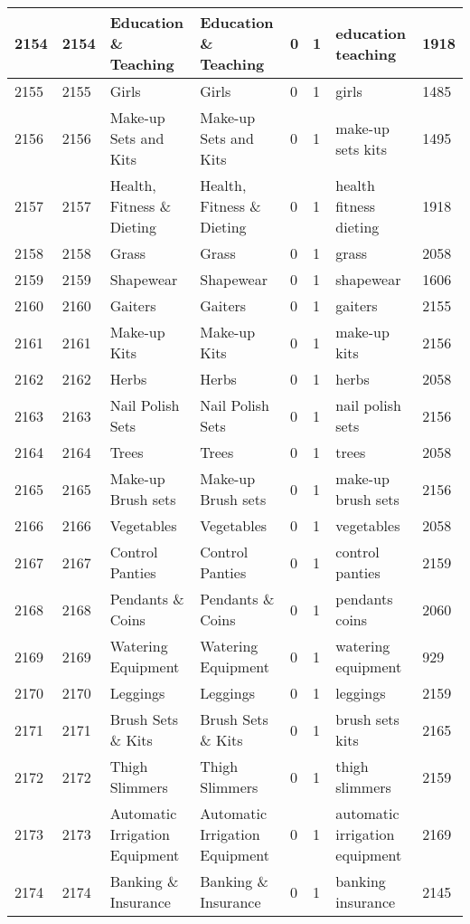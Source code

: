 \begin{longtable}{|l|l|l|l|l|l|l|l|}
2154 & 2154 & Education \& Teaching & Education \& Teaching & 0 & 1 & education teaching & 1918 \\ \hline 
2155 & 2155 & Girls & Girls & 0 & 1 & girls & 1485 \\ \hline 
2156 & 2156 & Make-up Sets and Kits & Make-up Sets and Kits & 0 & 1 & make-up sets kits & 1495 \\ \hline 
2157 & 2157 & Health, Fitness \& Dieting & Health, Fitness \& Dieting & 0 & 1 & health fitness dieting & 1918 \\ \hline 
2158 & 2158 & Grass & Grass & 0 & 1 & grass & 2058 \\ \hline 
2159 & 2159 & Shapewear & Shapewear & 0 & 1 & shapewear & 1606 \\ \hline 
2160 & 2160 & Gaiters & Gaiters & 0 & 1 & gaiters & 2155 \\ \hline 
2161 & 2161 & Make-up Kits & Make-up Kits & 0 & 1 & make-up kits & 2156 \\ \hline 
2162 & 2162 & Herbs & Herbs & 0 & 1 & herbs & 2058 \\ \hline 
2163 & 2163 & Nail Polish Sets & Nail Polish Sets & 0 & 1 & nail polish sets & 2156 \\ \hline 
2164 & 2164 & Trees & Trees & 0 & 1 & trees & 2058 \\ \hline 
2165 & 2165 & Make-up Brush sets & Make-up Brush sets & 0 & 1 & make-up brush sets & 2156 \\ \hline 
2166 & 2166 & Vegetables & Vegetables & 0 & 1 & vegetables & 2058 \\ \hline 
2167 & 2167 & Control Panties & Control Panties & 0 & 1 & control panties & 2159 \\ \hline 
2168 & 2168 & Pendants \& Coins & Pendants \& Coins & 0 & 1 & pendants coins & 2060 \\ \hline 
2169 & 2169 & Watering Equipment & Watering Equipment & 0 & 1 & watering equipment & 929 \\ \hline 
2170 & 2170 & Leggings & Leggings & 0 & 1 & leggings & 2159 \\ \hline 
2171 & 2171 & Brush Sets \& Kits & Brush Sets \& Kits & 0 & 1 & brush sets kits & 2165 \\ \hline 
2172 & 2172 & Thigh Slimmers & Thigh Slimmers & 0 & 1 & thigh slimmers & 2159 \\ \hline 
2173 & 2173 & Automatic Irrigation Equipment & Automatic Irrigation Equipment & 0 & 1 & automatic irrigation equipment & 2169 \\ \hline 
2174 & 2174 & Banking \& Insurance & Banking \& Insurance & 0 & 1 & banking insurance & 2145 \\ \hline 

\end{longtable}
